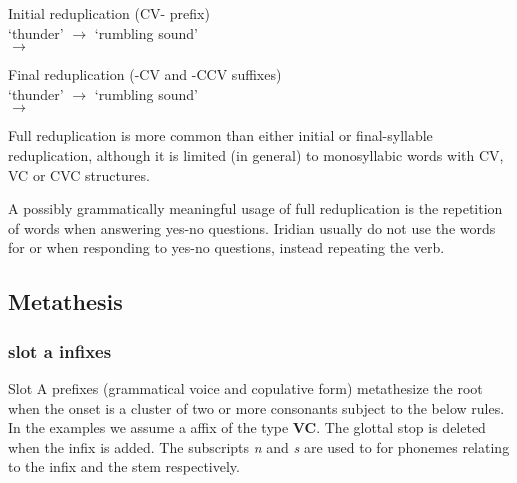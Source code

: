 \ex Initial reduplication (CV- prefix)\\
 `thunder' 	$\rightarrow$  `rumbling sound'\\
  $\rightarrow$  \\
\xe

\ex Final reduplication (-CV and -CCV suffixes)\\
 `thunder' 	$\rightarrow$  `rumbling sound'\\
  $\rightarrow$  \\
\xe

Full reduplication is more common than either initial or final-syllable reduplication, although it is limited (in general) to monosyllabic words with CV, VC or CVC structures.

A possibly grammatically meaningful usage of full reduplication is the repetition of words when answering yes-no questions. Iridian usually do not use the words for  or  when responding to yes-no questions, instead repeating the verb.

\subsection{Metathesis}

\subsubsection{slot a infixes}
Slot A prefixes (grammatical voice and copulative form) metathesize the root when the onset is a cluster of two or more consonants subject to the below rules. In the examples we assume a affix of the type \textbf{\glot VC}. The glottal stop is deleted when the infix is added. The subscripts \textit{n} and \textit{s} are used to for phonemes relating to the infix and the stem respectively.

